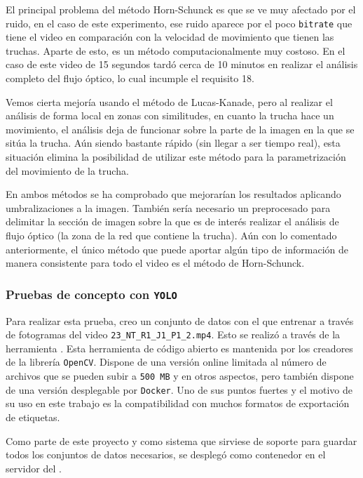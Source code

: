 El principal problema del método Horn-Schunck es que se ve muy afectado por el ruido, en el caso de este experimento, ese ruido aparece por el poco \texttt{bitrate} que tiene el video 
en comparación con la velocidad de movimiento que tienen las truchas. Aparte de esto, es un método computacionalmente muy costoso. En el caso de este video de 15 segundos tardó cerca de 10 
minutos en realizar el análisis completo del flujo óptico, lo cual incumple el requisito 18.

Vemos cierta mejoría usando el método de Lucas-Kanade, pero al realizar el análisis de forma local en zonas con similitudes, en cuanto la trucha hace un movimiento, el análisis deja de funcionar 
sobre la parte de la imagen en la que se sitúa la trucha. Aún siendo bastante rápido (sin llegar a ser tiempo real), esta situación elimina la posibilidad de utilizar este método para la 
parametrización del movimiento de la trucha.

En ambos métodos se ha comprobado que mejorarían los resultados aplicando umbralizaciones a la imagen. También sería necesario un preprocesado para delimitar la sección de 
imagen sobre la que es de interés realizar el análisis de flujo óptico (la zona de la red que contiene la trucha). Aún con lo comentado anteriormente, el único método que puede aportar algún 
tipo de información de manera consistente para todo el video es el método de Horn-Schunck.

\subsubsection{Pruebas de concepto con \texttt{YOLO}}

Para realizar esta prueba, creo un conjunto de datos con el que entrenar a través de fotogramas del video \verb|23_NT_R1_J1_P1_2.mp4|. Esto se realizó a través de la herramienta \texttt{}.\newline
Esta herramienta de código abierto\cite{cvat.aicorporationComputerVisionAnnotation2023} es mantenida por los creadores de la librería \texttt{OpenCV}. Dispone de una versión online limitada al número de 
archivos que se pueden subir a \texttt{500 MB} y en otros aspectos, pero también dispone de una versión desplegable por \texttt{Docker}. Uno de sus puntos fuertes y el motivo de su uso en este trabajo es 
la compatibilidad con muchos formatos de exportación de etiquetas.

Como parte de este proyecto y como sistema que sirviese de soporte para guardar todos los conjuntos de datos necesarios, se desplegó como contenedor en el servidor  del .

